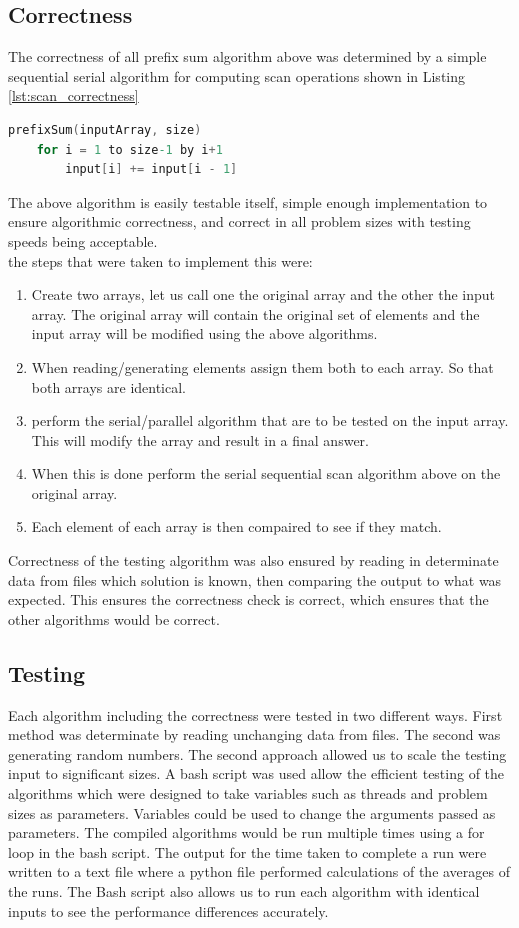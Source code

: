 \subsection{Correctness}
The correctness of all prefix sum algorithm above was determined by a simple sequential serial algorithm for computing scan operations shown in Listing \ref{lst:scan_correctness}
\begin{lstlisting}[language=C, caption={Serial Sequenctial Scan Algorithm with + operator}, label={lst:scan_correctness}]
prefixSum(inputArray, size) 
	for i = 1 to size-1 by i+1 
		input[i] += input[i - 1] 
\end{lstlisting}
The above algorithm is easily testable itself, simple enough implementation to ensure algorithmic correctness, and correct in all problem sizes with testing speeds being acceptable. 
\\the steps that were taken to implement this were:
\begin{enumerate}
	\item Create two arrays, let us call one the original array and the other the input array. The original array will contain the original set of elements and the input array will be modified using the above algorithms. 
	\item When reading/generating elements assign them both to each array. So that both arrays are identical.
	\item perform the serial/parallel algorithm that are to be tested on the input array. This will modify the array and result in a final answer.
	\item When this is done perform the serial sequential scan algorithm above on the original array.
	\item Each element of each array is then compaired to see if they match.
\end{enumerate}
Correctness of the testing algorithm was also ensured by reading in determinate data from files which solution is known, then comparing the output to what was expected. This ensures the correctness check is correct, which ensures that the other algorithms would be correct.
\subsection{Testing}
Each algorithm including the correctness were tested in two different ways. First method was determinate by reading unchanging data from files. The second was generating random numbers. The second approach allowed us to scale the testing input to significant sizes. A bash script was used allow the efficient testing of the algorithms which were designed to take variables such as threads and problem sizes as parameters. Variables could be used to change the arguments passed as parameters. The compiled algorithms would be run multiple times using a for loop in the bash script. The output for the time taken to complete a run were written to a text file where a python file performed calculations of the averages of the runs. 
The Bash script also allows us to run each algorithm with identical inputs to see the performance differences accurately.

